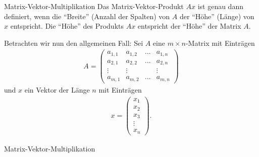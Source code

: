 \begin{frame}[fragile]{Matrix-Vektor-Multiplikation}
Das Matrix-Vektor-Produkt $Ax$ ist genau dann definiert, wenn die \enquote{Breite} (Anzahl der Spalten) von $A$ der \enquote{Höhe} (Länge) von $x$ entspricht. Die \enquote{Höhe} des Produkts $Ax$ entspricht der \enquote{Höhe} der Matrix $A$.

Betrachten wir nun den allgemeinen Fall: Sei $A$ eine $m\times n$-Matrix mit Einträgen
\begin{align*}
    A =
\begin{pmatrix}
a_{1,1} & a_{1,2} & \dots & a_{1,n}\\
a_{2,1} & a_{2,2} & \dots & a_{2,n}\\
\vdots & \vdots &       & \vdots\\
a_{m,1} & a_{m,2} & \dots & a_{m,n}
\end{pmatrix}
\end{align*}
und $x$ ein Vektor der Länge $n$ mit Einträgen
\begin{align*}
    x =
\begin{pmatrix}
x_1 \\
x_2 \\
x_3 \\
\vdots \\
x_n
\end{pmatrix}.
\end{align*}
\end{frame}

\begin{frame}[fragile]{Matrix-Vektor-Multiplikation}
		\leavevmode
		
\end{frame}

